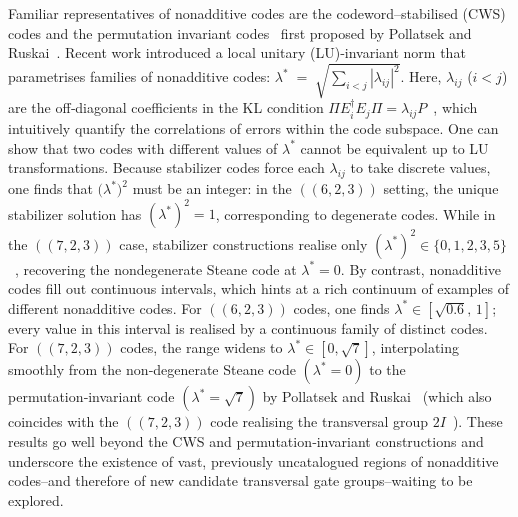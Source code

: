 \documentclass[8pt]{article}
\theoremstyle{definition}
\newcommand{\proj}{\Pi}
\begin{document}
Familiar representatives of nonadditive codes are the codeword--stabilised (CWS) codes
\cite{cross2009codeword,yu2007graphical,yu2008nonadditive,grassl2008non,chuang2009codeword} and the permutation invariant codes~\cite{ouyang2014permutation,ouyang2021permutation} first proposed by Pollatsek and
Ruskai~\cite{pollatsek2004permutationally}.
Recent work introduced a local unitary (LU)‑invariant norm
that parametrises families of nonadditive codes:
\(
\lambda^{\ast}\;=\;\sqrt{\sum_{i<j}|\lambda_{ij}|^2}.
\)
Here, \(\lambda_{ij}\) ($i<j$) are the off‑diagonal coefficients
in the KL condition $\proj E_i^\dag E_j \proj = \lambda_{ij} P$~\cite{du2024characterizing}, which intuitively quantify the correlations of errors within the code subspace. One can show that
two codes with different values of $\lambda^\ast$ cannot be equivalent up to LU transformations.
Because stabilizer codes force each $\lambda_{ij}$ to take discrete values, one finds that $\bigl(\lambda^{\ast}\bigr)^2$ must be an integer: in the $((6,2,3))$ setting, the unique stabilizer solution has $(\lambda^{\ast})^2 = 1$, corresponding to degenerate codes. While in the $((7,2,3))$ case, stabilizer constructions realise only
$
    (\lambda^{\ast})^2 \in \{0,1,2,3,5\}
$~\cite{cross2025small},
recovering the nondegenerate Steane code at $\lambda^\ast=0$.
By contrast, nonadditive codes fill out continuous intervals, which hints at a rich continuum of
examples of different nonadditive codes. For \(((6,2,3))\) codes, one finds
\(\lambda^\ast\in[\sqrt{0.6},\,1]\); every value in this interval is realised
by a continuous family of distinct codes. For \(((7,2,3))\) codes, the range
widens to \(\lambda^\ast\in[0,\sqrt{7}]\), interpolating smoothly from the
non‑degenerate Steane code \((\lambda^\ast=0)\) to the
permutation‑invariant code \((\lambda^\ast=\sqrt{7})\) by Pollatsek and
Ruskai~\cite{pollatsek2004permutationally} (which also coincides with the \(((7,2,3))\) code realising
the transversal group \(2I\)~\cite{kubischta2023family}).
These results go well beyond the CWS and permutation‑invariant
constructions and underscore the existence of vast, previously uncatalogued
regions of nonadditive codes--and therefore of new candidate transversal
gate groups--waiting to be explored.
\end{document}
